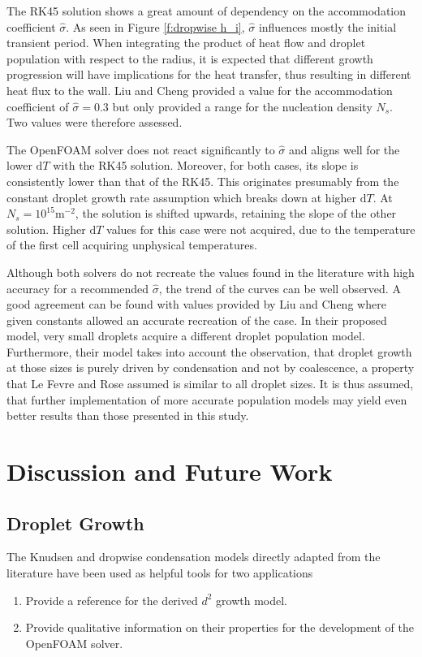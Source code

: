 \documentclass[12pt]{article}
\numberwithin{equation}{section}
\begin{document}
The RK45 solution shows a great amount of dependency on the accommodation coefficient $\hat{\sigma}$. As seen in Figure \ref{f:dropwise h_i}, $\hat{\sigma}$ influences mostly the initial transient period. When integrating the product of heat flow and droplet population with respect to the radius, it is expected that different growth progression will have implications for the heat transfer, thus resulting in different heat flux to the wall. Liu and Cheng provided a value for the accommodation coefficient of $\hat{\sigma}= 0.3$ but only provided a range for the nucleation density $N_{s}$. Two values were therefore assessed. 

The OpenFOAM solver does not react significantly to $\hat{\sigma}$ and aligns well for the lower $\mathrm{d}T$ with the RK45 solution. Moreover, for both cases, its slope is consistently lower than that of the RK45. This originates presumably from the constant droplet growth rate assumption which breaks down at higher $\mathrm{d}T$. At $N_{s}=10^{15}\mathrm{m}^{-2}$, the solution is shifted upwards, retaining the slope of the other solution. Higher $\mathrm{d}T$ values for this case were not acquired, due to the temperature of the first cell acquiring unphysical temperatures.

Although both solvers do not recreate the values found in the literature with high accuracy for a recommended $\hat{\sigma}$, the trend of the curves can be well observed. A good agreement can be found with values provided by Liu and Cheng \cite{liu2015dropwise} where given constants allowed an accurate recreation of the case. In their proposed model, very small droplets acquire a different droplet population model. Furthermore, their model takes into account the observation, that droplet growth at those sizes is purely driven by condensation and not by coalescence, a property that Le Fevre and Rose assumed is similar to all droplet sizes. It is thus assumed, that further implementation of more accurate population models may yield even better results than those presented in this study.  
\newpage
\section{Discussion and Future Work}\label{s:future_work}
\subsection{Droplet Growth}
The Knudsen and dropwise condensation models directly adapted from the literature have been used as helpful tools for two applications
\begin{enumerate}
    \item Provide a reference for the derived $d^{2}$ growth model.
    \item Provide qualitative information on their properties for the development of the OpenFOAM solver.
\end{enumerate}
\end{document}

